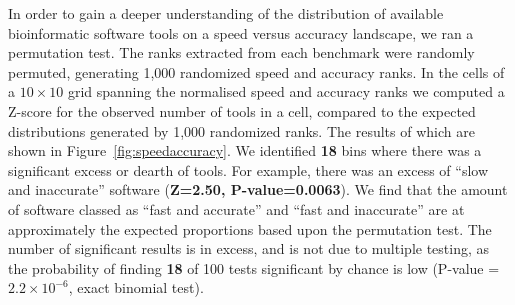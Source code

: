 \documentclass[fleqn,10pt]{SelfArx} %
\begin{document}

In order to gain a deeper understanding of the distribution of
available bioinformatic software tools on a speed versus accuracy
landscape, we ran a permutation test. The ranks extracted
from each benchmark were randomly permuted, generating 1,000
randomized speed and accuracy ranks. In the cells of a $10\times10$
grid spanning the normalised speed and accuracy ranks we computed a
Z-score for the observed number of tools in a cell, compared to the
expected distributions generated by 1,000 randomized ranks. The results
of which are shown in Figure~\ref{fig:speedaccuracy}. We identified \textbf{{\color{red}18}}
bins where there was a significant excess or dearth of tools. For
example, there was an excess of “slow and inaccurate” software (\textbf{{\color{red}Z=2.50,
P-value=0.0063}}). We find that the amount of software classed as “fast
and accurate” and “fast and inaccurate” are at approximately the
expected proportions based upon the permutation test. The number of
significant results is in excess, and is not due to multiple testing, as
the probability of finding \textbf{{\color{red}18}} of 100 tests significant by chance is
low (P-value = \textbf{{\color{red}$2.2\times 10^{-6}$}}, exact binomial test).

\end{document}
